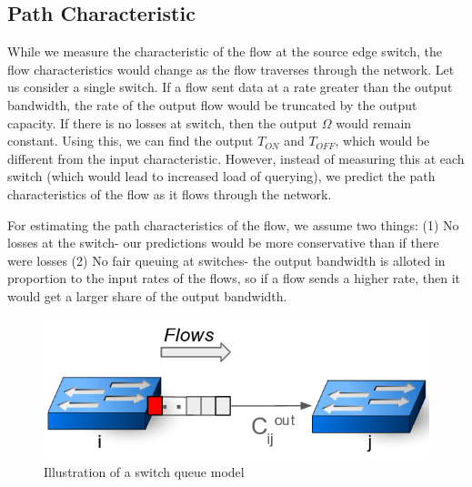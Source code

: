 \subsection{Path Characteristic}
While we measure the characteristic of the flow at the source edge switch, 
the flow characteristics would change as the flow traverses through the network.
Let us consider a single switch. If a flow sent data at a rate greater than the output
bandwidth, the rate of the output flow would be truncated by the output capacity. 
If there is no losses at switch, then the output $\Omega$ would remain
constant. Using this, we can find the output $T_{ON}$ and $T_{OFF}$, which
would be different from the input characteristic. However, instead of measuring 
this at each switch (which would lead to increased load of querying), we predict
the path characteristics of the flow as it flows through the network. 

For estimating the path characteristics of the flow, we assume two things: (1) No losses
at the switch- our predictions would be more conservative than if there were losses
(2) No fair queuing at switches- the output bandwidth is alloted in proportion to the input
rates of the flows, so if a flow sends a higher rate, then it would get a larger share of the output 
bandwidth. 

\begin{figure}[H]
	\centering
	\includegraphics[width=\columnwidth]{switchmodel.png}
	\caption{Illustration of a switch queue model}
	\label{fig:switchmodel}
\end{figure}


